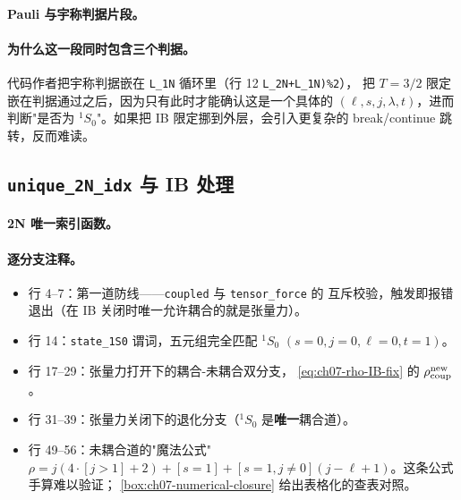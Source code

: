 \paragraph{Pauli 与宇称判据片段。}


\paragraph{为什么这一段同时包含三个判据。}
代码作者把宇称判据嵌在 \verb|L_1N| 循环里（行 12 \verb|L_2N+L_1N)%2|），
把 \(T = 3/2\) 限定嵌在判据通过之后，因为只有此时才能确认这是一个具体的
\((\ell, s, j, \lambda, t)\)，进而判断"是否为 \({}^1S_0\)"。如果把
IB 限定挪到外层，会引入更复杂的 break/continue 跳转，反而难读。

\subsection{\texttt{unique\_2N\_idx} 与 IB 处理}
\label{subsec:ch07-unique-2N-idx}

\paragraph{2N 唯一索引函数。}


\paragraph{逐分支注释。}
\begin{itemize}
  \item 行 4--7：第一道防线——\texttt{coupled} 与 \texttt{tensor\_force} 的
        互斥校验，触发即报错退出（在 IB 关闭时唯一允许耦合的就是张量力）。
  \item 行 14：\verb|state_1S0| 谓词，五元组完全匹配 \({}^1S_0\)
        \((s=0, j=0, \ell=0, t=1)\)。
  \item 行 17--29：张量力打开下的耦合-未耦合双分支，
        \cref{eq:ch07-rho-IB-fix} 的 \(\rho_{\rm coup}^{\rm new}\)。
  \item 行 31--39：张量力关闭下的退化分支（\({}^1S_0\) 是\textbf{唯一}耦合道）。
  \item 行 49--56：未耦合道的"魔法公式" \(\rho = j(4\cdot [j>1] + 2) +
        [s=1] + [s=1, j\neq 0](j - \ell + 1)\)。这条公式手算难以验证；
        \cref{box:ch07-numerical-closure} 给出表格化的查表对照。
\end{itemize}

